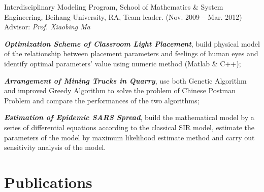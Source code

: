 \documentclass[10pt,letterpaper]{article}
\renewenvironment{itemize}{
\begin{list}{}{
    \setlength{\leftmargin}{1.5em}
    \setlength{\itemsep}{0.25em}
    \setlength{\parskip}{0pt}
    \setlength{\parsep}{0.25em}
    }
    }{
\end{list}
}
\begin{document}
\begin{itemize}
    \item Interdisciplinary Modeling Program, School of Mathematics \& System Engineering, Beihang University, RA, Team leader. (Nov. 2009 -- Mar. 2012) \\
    Advisor: \textit{Prof. Xiaobing Ma}
    \begin{itemize}
        \item \textbf{\textit{Optimization Scheme of Classroom Light Placement}}, build physical model of the relationship between placement parameters and feelings of human eyes and identify optimal parameters' value using numeric method (Matlab \& C++);
        \item \textit{\textbf{Arrangement of Mining Trucks in Quarry}}, use both Genetic Algorithm and improved Greedy Algorithm to solve the problem of Chinese Postman Problem and compare the performances of the two algorithms;
        \item \textbf{\textit{Estimation of Epidemic SARS Spread}}, build the mathematical model by a series of differential equations according to the classical SIR model, estimate the parameters of the model by maximum likelihood estimate method and carry out sensitivity analysis of the model.
    \end{itemize}
\end{itemize}

\newpage
\section*{Publications}
\end{document}

